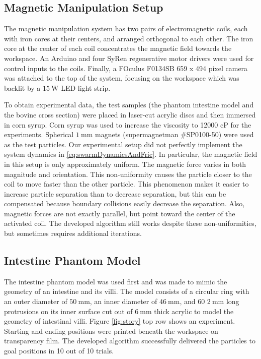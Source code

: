  \subsection{Magnetic Manipulation Setup}
 
 The magnetic manipulation system has two pairs of electromagnetic coils, each with iron cores at their centers, and arranged orthogonal to each other. The iron core at the center of each coil concentrates the magnetic field towards the workspace. An Arduino and four SyRen regenerative motor drivers were used for control inputs to the coils. Finally, a FOculus F0134SB 659 x 494 pixel camera was attached to the top of the system, focusing on the workspace which was backlit by a $\SI{15}{\watt}$ LED light strip. 
 
To obtain experimental data, the test samples (the phantom intestine model and the bovine cross section) were placed in laser-cut acrylic discs and then immersed in corn syrup. Corn syrup was used to increase the viscosity to 12000 cP for the experiments. Spherical $\SI{1}{\milli\metre}$ magnets (supermagnetman \#SP0100-50) were used as the test particles. Our experimental setup did not perfectly implement the system dynamics in \eqref{eq:swarmDynamicsAndFric}. In particular, the magnetic field in this setup is only approximately uniform. The magnetic force varies in both magnitude and orientation. This non-uniformity causes the particle closer to the coil to move faster than the other particle. This phenomenon makes it easier to increase particle separation than to decrease separation, but this can be compensated because boundary collisions easily decrease the separation. Also, magnetic forces are not exactly parallel, but point toward the center of the activated coil. The developed algorithm still works despite these non-uniformities, but sometimes requires additional iterations.
 


\subsection{Intestine Phantom Model}

The intestine phantom model was used first and was made to mimic the geometry of an intestine and its villi. The model consists of a circular ring with an outer diameter of $\SI{50}{\milli\metre}$, an inner diameter of $\SI{46}{\milli\metre}$, and 60 $\SI{2}{\milli\metre}$ long protrusions on its inner surface cut out of $\SI{6}{\milli\metre}$ thick acrylic to model the geometry of intestinal villi. Figure \ref{fig:story} top row shows an experiment. Starting and ending positions were printed beneath the workspace on transparency film. The developed algorithm successfully delivered the particles to goal positions in 10 out of 10 trials.



